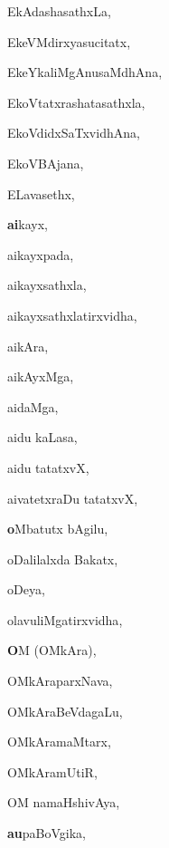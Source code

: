 \begin{multicols}{3}
{\noindent
{EkAdashasathxLa}, \pageref{EkAdashasathxLa}

\noindent
{EkeVMdirxyasucitatx}, \pageref{EkeVMdirxyasucitatx}

\noindent
{EkeYkaliMgAnusaMdhAna}, \pageref{EkeYkaliMgAnusaMdhAna}

\noindent
{EkoVtatxrashatasathxla}, \pageref{EkoVtatxrashatasathxla}

\noindent
{EkoVdidxSaTxvidhAna}, \pageref{EkoVdidxSaTxvidhAna}

\noindent
{EkoVBAjana}, \pageref{EkoVBAjana}

\noindent
{ELavasethx}, \pageref{ELavasethx}

\noindent
{{\large\textbf{ai}}kayx}, \pageref{aikayx}

\noindent
{aikayxpada}, \pageref{aikayxpada}

\noindent
{aikayxsathxla}, \pageref{aikayxsathxla}

\noindent
{aikayxsathxlatirxvidha}, \pageref{aikayxsathxlatirxvidha}

\noindent
{aikAra}, \pageref{aikAra}

\noindent
{aikAyxMga}, \pageref{aikAyxMga}

\noindent
{aidaMga}, \pageref{aidaMga}

\noindent
{aidu kaLasa}, \pageref{aidu kaLasa}

\noindent
{aidu tatatxvX}, \pageref{aidu tatatxvX}

\noindent
{aivatetxraDu tatatxvX}, \pageref{aivatetxraDu tatatxvX}

\noindent
{{\large\textbf{o}}Mbatutx bAgilu}, \pageref{oMbatutx bAgilu}

\noindent
{oDalilalxda Bakatx}, \pageref{oDalilalxda Bakatx}

\noindent
{oDeya}, \pageref{oDeya}

\noindent
{olavuliMgatirxvidha}, \pageref{olavuliMgatirxvidha}

\noindent
{{\large\textbf{O}}M (OMkAra)}, \pageref{OM (OMkAra)}

\noindent
{OMkAraparxNava}, \pageref{OMkAraparxNava}

\noindent
{OMkAraBeVdagaLu}, \pageref{OMkAraBeVdagaLu}

\noindent
{OMkAramaMtarx}, \pageref{OMkAramaMtarx}

\noindent
{OMkAramUtiR}, \pageref{OMkAramUtiR}

\noindent
{OM namaHshivAya}, \pageref{OM namaHshivAya}

\noindent
{{\large\textbf{au}}paBoVgika}, \pageref{aupaBoVgika}

}
\end{multicols}
